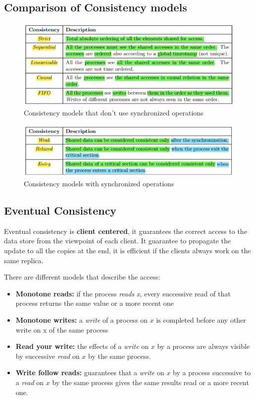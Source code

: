 \subsection{Comparison of Consistency models}

\begin{figure}[!h]
    \centering
    \includegraphics[width=.90\linewidth]{images/Replication/consistencyModelsTable1.png}
    \caption{Consistency models that don’t use synchronized operations}
\end{figure}

\begin{figure}[!h]
    \centering
    \includegraphics[width=.90\linewidth]{images/Replication/consistencyModelsTable2.png}
    \caption{Consistency models with synchronized operations}
\end{figure}

\subsection{Eventual Consistency}
Eventual consistency is \textbf{client centered}, it guarantees the correct access to the data store from the viewpoint of each client. It guarantee to propagate the update to all the copies at the end, it is efficient if the clients always work on the same replica.

There are different models that describe the access:
\begin{itemize}
    \item \textbf{Monotone reads:} if the process \textit{reads x}, every successive read of that process returns the same value or a more recent one
    \item \textbf{Monotone writes:} a \textit{write} of a process on \(x\) is completed before any other write on x of the same process
    \item \textbf{Read your write:} the effects of a \textit{write} on \(x\) by a process are always visible by successive \textit{read} on \(x\) by the same process.
    \item \textbf{Write follow reads:} guarantees that a \textit{write} on \(x\) by a process successive to a \textit{read} on \(x\) by the same process gives the same results read or a more recent one.
\end{itemize}


